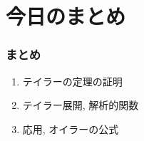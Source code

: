 \documentclass[dvipdfmx,cjk,10.2pt]{beamer}
\theoremstyle{definition}
\begin{document}















\section{今日のまとめ}
\begin{frame}
\frametitle{まとめ}   


\begin{enumerate}
\item テイラーの定理の証明
\item テイラー展開, 解析的関数
\item 応用, オイラーの公式
\end{enumerate} 

\end{frame}
\end{document}
